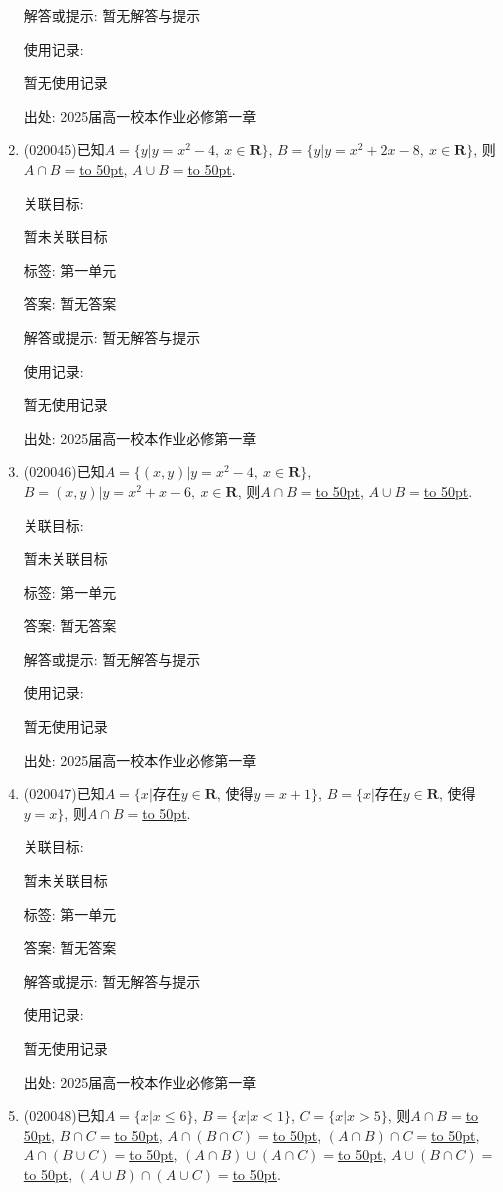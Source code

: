 \documentclass[10pt,a4paper]{article}
\newcommand{\blank}[1]{\underline{\hbox to #1pt{}}}
\begin{document}
\begin{enumerate}[1.]
解答或提示: 暂无解答与提示

使用记录:

暂无使用记录


出处: 2025届高一校本作业必修第一章
\item { (020045)}已知$A=\{y|y=x^2-4, \ x\in\mathbf{R}\}$, $B=\{y|y=x^2+2x-8,\  x\in \mathbf{R}\}$, 则$A\cap B=$\blank{50}, $A\cup B=$\blank{50}.


关联目标:

暂未关联目标



标签: 第一单元

答案: 暂无答案

解答或提示: 暂无解答与提示

使用记录:

暂无使用记录


出处: 2025届高一校本作业必修第一章
\item { (020046)}已知$A=\{(x, y)|y=x^2-4, \ x\in \mathbf{R}\}$, $B={(x, y)|y=x^2+x-6, \  x\in\mathbf{R}}$, 则$A\cap B=$\blank{50}, $ A\cup B=$\blank{50}.


关联目标:

暂未关联目标



标签: 第一单元

答案: 暂无答案

解答或提示: 暂无解答与提示

使用记录:

暂无使用记录


出处: 2025届高一校本作业必修第一章
\item { (020047)}已知$A=\{x|$存在$y\in \mathbf{R}$, 使得$y=x+1\}$, $B=\{x|$存在$y\in \mathbf{R}$, 使得$y=x\}$, 则$A\cap B= $\blank{50}.


关联目标:

暂未关联目标



标签: 第一单元

答案: 暂无答案

解答或提示: 暂无解答与提示

使用记录:

暂无使用记录


出处: 2025届高一校本作业必修第一章
\item { (020048)}已知$A=\{x|x\le 6\}$, $B=\{x|x<1\}$, $C=\{x|x>5\}$, 则$A\cap B=$\blank{50}, $B\cap C=$\blank{50}, $A\cap(B\cap C)=$\blank{50}, $(A\cap B)\cap C=$\blank{50}, $A\cap(B\cup C)=$\blank{50}, $(A\cap B)\cup(A\cap C)=$\blank{50}, $A\cup(B\cap C)=$\blank{50}, $ (A\cup B)\cap(A\cup C)=$\blank{50}.



\end{enumerate}
\end{document}

